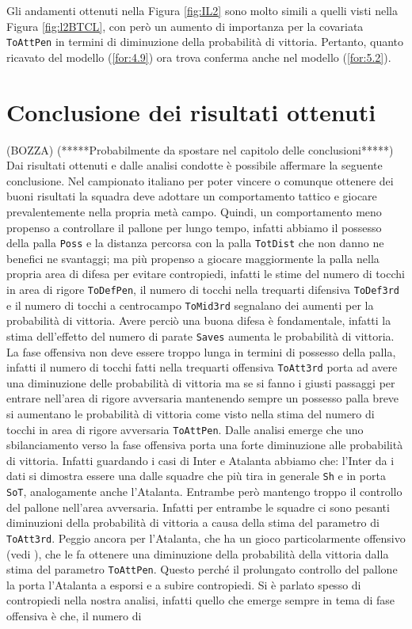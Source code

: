 Gli andamenti ottenuti nella Figura \ref{fig:IL2} sono molto simili a quelli visti nella Figura \ref{fig:l2BTCL}, con però un aumento di importanza per la covariata \texttt{ToAttPen} in termini di diminuzione della probabilità di vittoria. Pertanto, quanto ricavato del modello (\ref{for:4.9}) ora trova conferma anche nel modello (\ref{for:5.2}).\\

\section{Conclusione dei risultati ottenuti}(BOZZA)
(*****Probabilmente da spostare nel capitolo delle conclusioni*****)\\

Dai risultati ottenuti e dalle analisi condotte è possibile affermare la seguente conclusione. Nel campionato italiano per poter vincere o comunque ottenere dei buoni risultati la squadra deve adottare un comportamento tattico e giocare prevalentemente nella propria metà campo. Quindi, un comportamento meno propenso a controllare il pallone per lungo tempo, infatti abbiamo il possesso della palla \texttt{Poss} e la distanza percorsa con la palla \texttt{TotDist} che non danno ne benefici ne svantaggi; ma più propenso a giocare maggiormente la palla nella propria area di difesa per evitare contropiedi, infatti le stime del numero di tocchi in area di rigore \texttt{ToDefPen}, il numero di tocchi nella trequarti difensiva \texttt{ToDef3rd} e il numero di tocchi a centrocampo \texttt{ToMid3rd} segnalano dei aumenti per la probabilità di vittoria. Avere perciò una buona difesa è fondamentale, infatti la stima dell'effetto del numero di parate \texttt{Saves} aumenta le probabilità di vittoria. La fase offensiva non deve essere troppo lunga in termini di possesso della palla, infatti il numero di tocchi fatti nella trequarti offensiva \texttt{ToAtt3rd} porta ad avere una diminuzione delle probabilità di vittoria ma se si fanno i giusti passaggi per entrare nell'area di rigore avversaria mantenendo sempre un possesso palla breve si aumentano le probabilità di vittoria come visto nella stima del numero di tocchi in area di rigore avversaria \texttt{ToAttPen}. Dalle analisi emerge che uno sbilanciamento verso la fase offensiva porta una forte diminuzione alle probabilità di vittoria. Infatti guardando i casi di Inter e Atalanta abbiamo che: l'Inter da i dati si dimostra essere una dalle squadre che più tira in generale \texttt{Sh} e in porta \texttt{SoT}, analogamente anche l'Atalanta. Entrambe però mantengo troppo il controllo del pallone nell'area avversaria. Infatti per entrambe le squadre ci sono pesanti diminuzioni della probabilità di vittoria a causa della stima del parametro di \texttt{ToAtt3rd}. Peggio ancora per l'Atalanta, che ha un gioco particolarmente offensivo (vedi \textit{\cite{ataGioco}}), che le fa ottenere una diminuzione della probabilità della vittoria dalla stima del parametro \texttt{ToAttPen}. Questo perché il prolungato controllo del pallone la porta l'Atalanta a esporsi e a subire contropiedi. Si è parlato spesso di contropiedi nella nostra analisi, infatti quello che emerge sempre in tema di fase offensiva è che, il numero di 